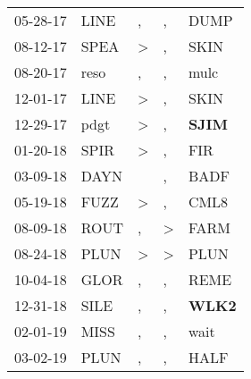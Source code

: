 \begin{supertabular}{p{0.07\textwidth}p{0.06\textwidth}p{0.02\textwidth}p{0.02\textwidth}p{0.06\textwidth}}
          05-28-17\textsuperscript{} &           LINE\textsuperscript{} &                , &                , &           DUMP\textsuperscript{} \\
          08-12-17\textsuperscript{} &           SPEA\textsuperscript{} &     \textgreater &                , &           SKIN\textsuperscript{} \\
          08-20-17\textsuperscript{} &           reso\textsuperscript{} &                , &                , &           mulc\textsuperscript{} \\
          12-01-17\textsuperscript{} &           LINE\textsuperscript{} &     \textgreater &                , &           SKIN\textsuperscript{} \\
          12-29-17\textsuperscript{} &           pdgt\textsuperscript{} &     \textgreater &                , &  \textbf{SJIM\textsuperscript{}} \\
          01-20-18\textsuperscript{} &           SPIR\textsuperscript{} &     \textgreater &                , &            FIR\textsuperscript{} \\
          03-09-18\textsuperscript{} &           DAYN\textsuperscript{} &                  &                , &           BADF\textsuperscript{} \\
          05-19-18\textsuperscript{} &           FUZZ\textsuperscript{} &     \textgreater &                , &           CML8\textsuperscript{} \\
          08-09-18\textsuperscript{} &           ROUT\textsuperscript{} &                , &     \textgreater &           FARM\textsuperscript{} \\
          08-24-18\textsuperscript{} &           PLUN\textsuperscript{} &     \textgreater &     \textgreater &           PLUN\textsuperscript{} \\
          10-04-18\textsuperscript{} &           GLOR\textsuperscript{} &                , &                , &           REME\textsuperscript{} \\
          12-31-18\textsuperscript{} &           SILE\textsuperscript{} &                , &                , &  \textbf{WLK2\textsuperscript{}} \\
          02-01-19\textsuperscript{} &           MISS\textsuperscript{} &                , &                , &           wait\textsuperscript{} \\
          03-02-19\textsuperscript{} &           PLUN\textsuperscript{} &                , &                , &           HALF\textsuperscript{} \\

\end{supertabular}

